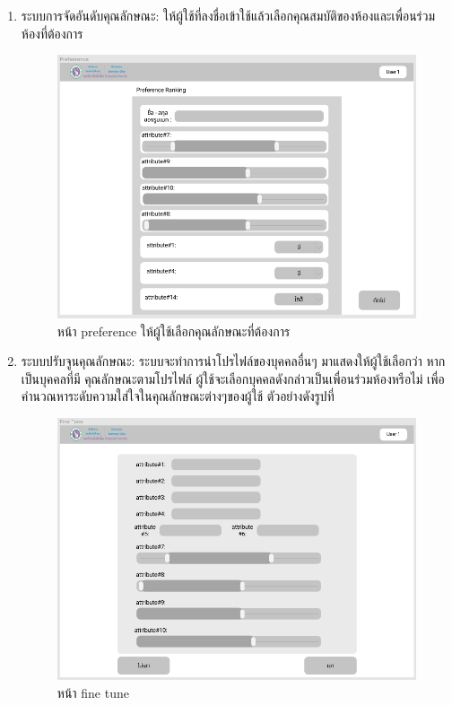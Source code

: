 \begin{enumerate}
  \clearpage
  \item ระบบการจัดอันดับคุณลักษณะ: ให้ผู้ใช้ที่ลงชื่อเข้าใช้แล้วเลือกคุณสมบัติของห้องและเพื่อนร่วมห้องที่ต้องการ
  \begin{figure}[h]
  \begin{center}
  \includegraphics[width=\linewidth]{photo/Preference.png}
  \end{center}
  \caption{หน้า preference ให้ผู้ใช้เลือกคุณลักษณะที่ต้องการ}
  \label{fig:preference}
  \end{figure}
  
  \clearpage
  \item ระบบปรับจูนคุณลักษณะ: ระบบจะทำการนำโปรไฟล์ของบุคคลอื่นๆ มาแสดงให้ผู้ใช้เลือกว่า หากเป็นบุคคลที่มี
  คุณลักษณะตามโปรไฟล์ ผู้ใช้จะเลือกบุคคลดังกล่าวเป็นเพื่อนร่วมห้องหรือไม่ เพื่อคำนวณหาระดับความใส่ใจในคุณลักษณะต่างๆของผู้ใช้ 
  ตัวอย่างดังรูปที่~
  \begin{figure}[h]
  \begin{center}
  \includegraphics[width=\linewidth]{photo/finetune.png}
  \end{center}
  \caption{หน้า fine tune}
  \label{fig:finetune}
  \end{figure}


\end{enumerate}
